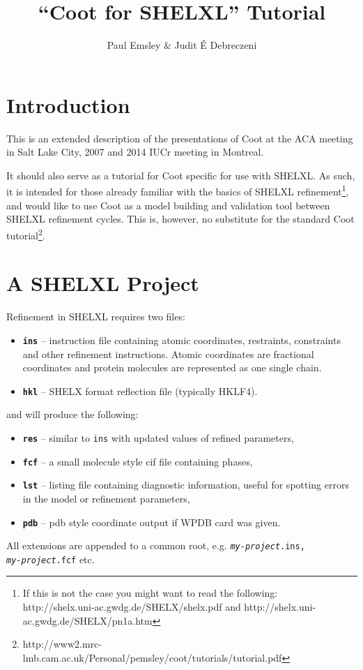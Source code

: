 \documentclass{article}
\begin{document}
\title{``Coot for SHELXL'' Tutorial}
\author{Paul Emsley \& Judit \'{E} Debreczeni}

\maketitle
\tableofcontents

\pagebreak
\section{Introduction}

This is an extended description of the presentations of Coot at the ACA
meeting in Salt Lake City, 2007 and 2014 IUCr meeting in Montreal.

It should also serve as a tutorial for Coot specific for use with
SHELXL. As such, it is intended for those already familiar with the
basics of SHELXL refinement\footnote{If this is not the case you might
  want to read the
  following:\\http://shelx.uni-ac.gwdg.de/SHELX/shelx.pdf and
  http://shelx.uni-ac.gwdg.de/SHELX/pn1a.htm}, and would like to use
Coot as a model building and validation tool between SHELXL refinement
cycles. This is, however, no substitute for the standard Coot
tutorial\footnote{http://www2.mrc-lmb.cam.ac.uk/Personal/pemsley/coot/tutorials/tutorial.pdf}.


\section{A SHELXL Project}
Refinement in SHELXL requires two files:
\begin{itemize}
\item {\bf \texttt{ins}} -- instruction file containing atomic
  coordinates, restraints, constraints and other refinement
  instructions. Atomic coordinates are fractional coordinates and
  protein molecules are represented as one single chain.
\item {\bf \texttt{hkl}} -- SHELX format reflection file (typically HKLF4).
\end{itemize}
and will produce the following:
\begin{itemize}
\item {\bf \texttt{res}} -- similar to \texttt{ins} with updated
  values of refined parameters,
\item {\bf \texttt{fcf}} -- a small molecule style cif file containing
  phases,
\item {\bf \texttt{lst}} -- listing file containing diagnostic
  information, useful for spotting errors in the model or refinement
  parameters,
\item {\bf \texttt{pdb}} -- pdb style coordinate output if WPDB card was given.
\end{itemize}
All extensions are appended to a common root, e.g.
\texttt{\emph{my-project}.ins,\\\emph{my-project}.fcf} etc.
\end{document}
